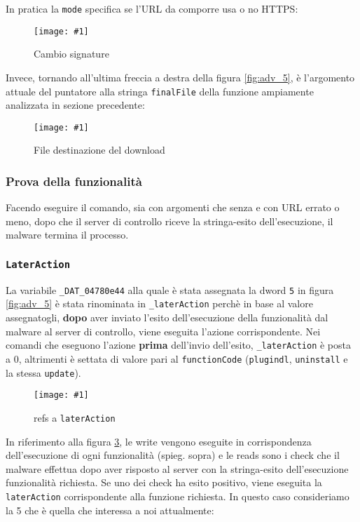 \documentclass[
    a4paper, %
    11pt %
]{article}
\newcommand{\pic}[4]{\begin{figure}[H]
            \centering
            \texttt{[image: \#1]}
            \caption{#2}
            \label{fig:#1}
            \end{figure}}
\begin{document}
            In pratica la \texttt{mode} specifica se l'URL da comporre usa o no HTTPS:
            
            \pic{adv_5_url_sign}{Cambio signature}{15cm}{1.5cm}

            Invece, tornando all'ultima freccia a destra della figura \ref{fig:adv_5}, è l'argomento attuale
            del puntatore alla stringa \texttt{finalFile} della funzione ampiamente analizzata in sezione
            precedente:

            \pic{adv_5_finalfile}{File destinazione del download}{16cm}{2cm}

            \subsubsection{Prova della funzionalità}
            Facendo eseguire il comando, sia con argomenti che senza e con URL errato o meno, dopo che il
            server di controllo riceve la stringa-esito dell'esecuzione, il malware termina il processo.

            \subsubsection{\texttt{LaterAction}}

            La variabile \texttt{\_DAT\_04780e44} alla quale è stata assegnata la dword \texttt{5} in figura
            \ref{fig:adv_5} è stata rinominata in \texttt{\_laterAction} perchè in base al valore assegnatogli,
            \textbf{dopo} aver inviato l'esito dell'esecuzione della funzionalità dal malware al server di
            controllo, viene eseguita l'azione corrispondente. Nei comandi che eseguono l'azione \textbf{prima}
            dell'invio dell'esito, \texttt{\_laterAction} è posta a 0, altrimenti è settata di valore pari
            al \texttt{functionCode} (\texttt{plugindl}, \texttt{uninstall} e la stessa \texttt{update}).

            \pic{adv_5_later_refs}{refs a \texttt{laterAction}}{14cm}{6cm}

            In riferimento alla figura \ref{fig:adv_5_later_refs}, le write vengono eseguite in corrispondenza
            dell'esecuzione di ogni funzionalità (spieg. sopra) e le reads sono i check che il malware effettua
            dopo aver risposto al server con la stringa-esito dell'esecuzione funzionalità richiesta. Se uno
            dei check ha esito positivo, viene eseguita la \texttt{laterAction} corrispondente alla funzione 
            richiesta.
            In questo caso consideriamo la 5 che è quella che interessa a noi attualmente:
            
\end{document}
